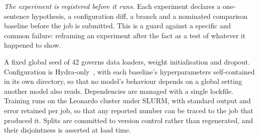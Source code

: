 \emph{The experiment is registered before it runs.} Each experiment declares a one-sentence
hypothesis, a configuration diff, a branch and a nominated comparison baseline before the job
is submitted. This is a guard against a specific and common failure: reframing an experiment
after the fact as a test of whatever it happened to show.

A fixed global seed of 42 governs data loaders, weight initialisation and dropout.
Configuration is Hydra-only~\cite{hydra}, with each baseline's hyperparameters
self-contained in its own directory, so that no model's behaviour depends on a global
setting another model also reads. Dependencies are managed with a single lockfile. Training
runs on the Leonardo cluster under SLURM, with standard output and error retained per job,
so that any reported number can be traced to the job that produced it. Splits are committed
to version control rather than regenerated, and their disjointness is asserted at load time.

\par

